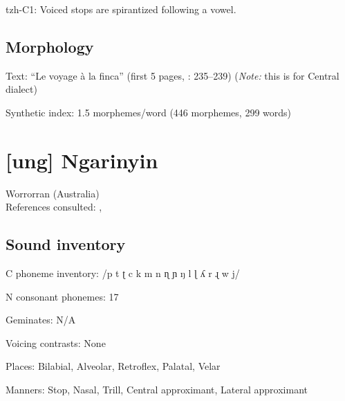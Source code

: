 {\begin{appendixdesc}
\item[tzh-C1:] Voiced stops are spirantized following a vowel. \citep[11]{Kaufman1971}
\end{appendixdesc}
\subsection*{Morphology}

\begin{appendixdesc}

\item[Text:] “Le voyage à la finca” (first 5 pages, \citealt{Polian2006}: 235--239) (\textit{Note:} this is for Central dialect)

\item[Synthetic index:] 1.5 morphemes/word (446 morphemes, 299 words)
\end{appendixdesc}
\newpage{}
\section*{[ung] Ngarinyin}  %
Worrorran (Australia)\medskip\\
References consulted: \citet{CoateOates1970}, \citet{Rumsey1978}

\subsection*{Sound inventory}
\begin{appendixdesc}

\item[C phoneme inventory:] /p t ʈ c k m n ɳ ɲ ŋ l ɭ ʎ r ɻ w j/

\item[N consonant phonemes:] 17

\item[Geminates:] N/A

\item[Voicing contrasts:] None

\item[Places:] Bilabial, Alveolar, Retroflex, Palatal, Velar

\item[Manners:] Stop, Nasal, Trill, Central approximant, Lateral approximant


\end{appendixdesc}}
